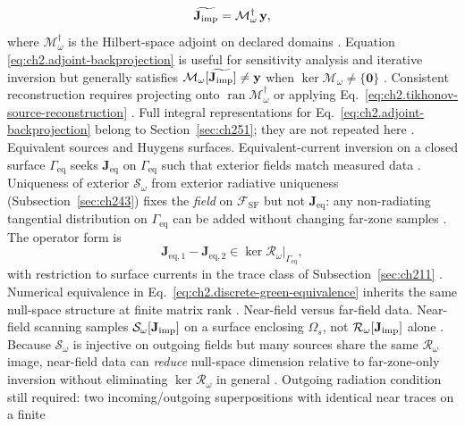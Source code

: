 \begin{equation}
\label{eq:ch2.adjoint-backprojection}
\widetilde{\mathbf{J}_{\mathrm{imp}}}
=
\mathcal{M}_\omega^{\dagger}\,\mathbf{y},
\end{equation}
where \(\mathcal{M}_\omega^{\dagger}\) is the Hilbert-space adjoint on declared
domains \cite{stratton1941}. Equation
\eqref{eq:ch2.adjoint-backprojection} is useful for sensitivity analysis and
iterative inversion but generally satisfies
\(\mathcal{M}_\omega[\widetilde{\mathbf{J}_{\mathrm{imp}}}]\neq\mathbf{y}\) when
\(\ker\mathcal{M}_\omega\neq\{\mathbf{0}\}\) \cite{harrington2001}. Consistent
reconstruction requires projecting onto \(\operatorname{ran}\mathcal{M}_\omega^{\dagger}\)
or applying Eq.~\eqref{eq:ch2.tikhonov-source-reconstruction}
\cite{stratton1941}. Full integral representations for
Eq.~\eqref{eq:ch2.adjoint-backprojection} belong to Section~\ref{sec:ch251}; they are
not repeated here \cite{harrington2001}.
Equivalent sources and Huygens surfaces. Equivalent-current inversion on a closed surface \(\Gamma_{\mathrm{eq}}\) seeks
\(\mathbf{J}_{\mathrm{eq}}\) on \(\Gamma_{\mathrm{eq}}\) such that exterior fields
match measured data \cite{stratton1941}. Uniqueness of exterior
\(\mathcal{S}_\omega\) from exterior radiative uniqueness (Subsection~\ref{sec:ch243})
fixes the \emph{field} on \(\mathcal{F}_{\mathrm{SF}}\) but not
\(\mathbf{J}_{\mathrm{eq}}\): any non-radiating tangential distribution on
\(\Gamma_{\mathrm{eq}}\) can be added without changing far-zone samples
\cite{harrington2001}. The operator form is
\begin{equation}
\label{eq:ch2.equivalent-source-ambiguity}
\mathbf{J}_{\mathrm{eq},1}-\mathbf{J}_{\mathrm{eq},2}
\in
\ker\mathcal{R}_\omega\big|_{\Gamma_{\mathrm{eq}}},
\end{equation}
with restriction to surface currents in the trace class of
Subsection~\ref{sec:ch211} \cite{stratton1941}. Numerical equivalence in
Eq.~\eqref{eq:ch2.discrete-green-equivalence} inherits the same null-space structure
at finite matrix rank \cite{harrington2001}.
Near-field versus far-field data. Near-field scanning samples \(\mathcal{S}_\omega[\mathbf{J}_{\mathrm{imp}}]\) on a surface enclosing
\(\Omega_s\), not \(\mathcal{R}_\omega[\mathbf{J}_{\mathrm{imp}}]\) alone \cite{stratton1941}. Because
\(\mathcal{S}_\omega\) is injective on outgoing fields but many sources share the
same \(\mathcal{R}_\omega\) image, near-field data can \emph{reduce} null-space
dimension relative to far-zone-only inversion without eliminating
\(\ker\mathcal{R}_\omega\) in general \cite{harrington2001}. Outgoing radiation condition still
required: two incoming/outgoing superpositions with identical near traces on a finite
